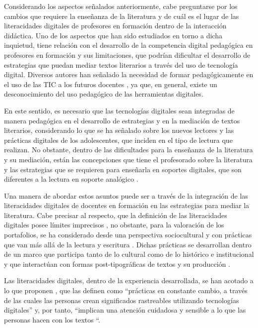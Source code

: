Considerando los aspectos señalados anteriormente, cabe preguntarse por
los cambios que requiere la enseñanza de la literatura y de cuál es el
lugar de las literacidades digitales de profesores en formación dentro
de la interacción didáctica. Uno de los aspectos que han sido estudiados
en torno a dicha inquietud, tiene relación con el desarrollo de la
competencia digital pedagógica en profesores en formación y sus
limitaciones, que podrían dificultar el desarrollo de estrategias que
puedan mediar textos literarios a través del uso de tecnología digital.
Diversos autores han señalado la necesidad de formar pedagógicamente en
el uso de las TIC a los futuros docentes \cite{ayala2015,sandoval-rubilar_alveal_fuentes_2017,Silva_Morales_Lázaro-Cantabrana_Gisbert_Miranda_Rivoir_Onetto_2019},
ya que, en general, existe un desconocimiento del uso pedagógico de las
herramientas digitales.
	
En este sentido, es necesario que las tecnologías digitales sean
integradas de manera pedagógica en el desarrollo de estrategias y en la
mediación de textos literarios, considerando lo que se ha señalado sobre
los nuevos lectores y las prácticas digitales de los adolescentes, que
inciden en el tipo de lectura que realizan. No obstante, dentro de las
dificultades para la enseñanza de la literatura y su mediación, están
las concepciones que tiene el profesorado sobre la literatura \cite{barra2022} y las estrategias que se requieren para enseñarla
en soportes digitales, que son diferentes a la lectura en soporte
analógico \cite{ryan_2004}.

Una manera de abordar estos asuntos puede ser a través de la integración
de las literacidades digitales de docentes en formación en las
estrategias para mediar la literatura. Cabe precisar al respecto, que la
definición de las literacidades digitales posee límites imprecisos
\cite{manghi_haquin_2016,villar_onrubia_morini_marin_nascimbeni_2022},
no obstante, para la valoración de los portafolios, se ha considerado
desde una perspectiva sociocultural y con prácticas que van más allá de
la lectura y escritura \cite{villar_onrubia_morini_marin_nascimbeni_2022}. Dichas
prácticas se desarrollan dentro de un marco que participa tanto de lo
cultural como de lo histórico e institucional \cite{gee2015} y que
interactúan con formas post-tipográficas de textos y su producción
\cite{lankshear_knobel_2008}.

Las literacidades digitales, dentro de la experiencia desarrollada, se
han acotado a lo que proponen \textcite[p. 9]{gillen_barton_2010}, que las definen como
``prácticas en constante cambio, a través de las cuales las personas
crean significados rastreables utilizando tecnologías digitales'' y, por
tanto, ``implican una atención cuidadosa y sensible a lo que las
personas hacen con los textos ``.

